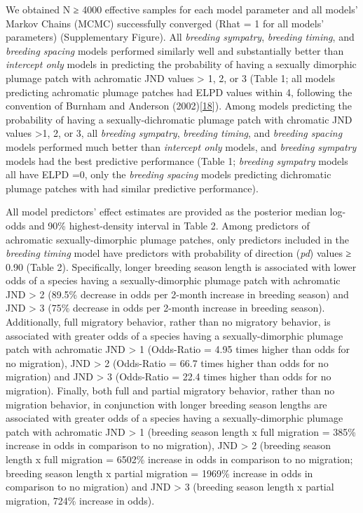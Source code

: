 \documentclass[
  a4paper,
]{article}
\begin{document}
We obtained N ≥ 4000 effective samples for each model parameter and all
models' Markov Chains (MCMC) successfully converged (Rhat = 1 for all
models' parameters) (Supplementary Figure). All \emph{breeding
sympatry}, \emph{breeding timing}, and \emph{breeding spacing} models
performed similarly well and substantially better than \emph{intercept
only} models in predicting the probability of having a sexually
dimorphic plumage patch with achromatic JND values \textgreater{} 1, 2,
or 3 (Table 1; all models predicting achromatic plumage patches had ELPD
values within 4, following the convention of Burnham and Anderson
(2002){[}\protect\hyperlink{ref-burnham2002}{18}{]}). Among models
predicting the probability of having a sexually-dichromatic plumage
patch with chromatic JND values \textgreater1, 2, or 3, all
\emph{breeding sympatry}, \emph{breeding timing}, and \emph{breeding
spacing} models performed much better than \emph{intercept only} models,
and \emph{breeding sympatry} models had the best predictive performance
(Table 1; \emph{breeding sympatry} models all have ELPD =0, only the
\emph{breeding spacing} models predicting dichromatic plumage patches
with had similar predictive performance).

All model predictors' effect estimates are provided as the posterior
median log-odds and 90\% highest-density interval in Table 2. Among
predictors of achromatic sexually-dimorphic plumage patches, only
predictors included in the \emph{breeding timing} model have predictors
with probability of direction (\emph{pd}) values ≥ 0.90 (Table 2).
Specifically, longer breeding season length is associated with lower
odds of a species having a sexually-dimorphic plumage patch with
achromatic JND \textgreater{} 2 (89.5\% decrease in odds per 2-month
increase in breeding season) and JND \textgreater{} 3 (75\% decrease in
odds per 2-month increase in breeding season). Additionally, full
migratory behavior, rather than no migratory behavior, is associated
with greater odds of a species having a sexually-dimorphic plumage patch
with achromatic JND \textgreater{} 1 (Odds-Ratio = 4.95 times higher
than odds for no migration), JND \textgreater{} 2 (Odds-Ratio = 66.7
times higher than odds for no migration) and JND \textgreater{} 3
(Odds-Ratio = 22.4 times higher than odds for no migration). Finally,
both full and partial migratory behavior, rather than no migration
behavior, in conjunction with longer breeding season lengths are
associated with greater odds of a species having a sexually-dimorphic
plumage patch with achromatic JND \textgreater{} 1 (breeding season
length x full migration = 385\% increase in odds in comparison to no
migration), JND \textgreater{} 2 (breeding season length x full
migration = 6502\% increase in odds in comparison to no migration;
breeding season length x partial migration = 1969\% increase in odds in
comparison to no migration) and JND \textgreater{} 3 (breeding season
length x partial migration, 724\% increase in odds).
\end{document}
